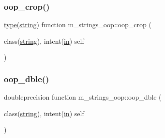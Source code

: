 \mbox{\label{namespacem__strings__oop_aa1a395d359592720a842054fd0aaff0a}} 
\subsubsection{\texorpdfstring{oop\+\_\+crop()}{oop\_crop()}}
{\footnotesize\ttfamily \hyperlink{stop__watch_83_8txt_a70f0ead91c32e25323c03265aa302c1c}{type}(\hyperlink{structm__strings__oop_1_1string}{string}) function m\+\_\+strings\+\_\+oop\+::oop\+\_\+crop (\begin{DoxyParamCaption}\item[{class(\hyperlink{structm__strings__oop_1_1string}{string}), intent(\hyperlink{M__journal_83_8txt_afce72651d1eed785a2132bee863b2f38}{in})}]{self }\end{DoxyParamCaption})\hspace{0.3cm}{\ttfamily [private]}}

\mbox{\label{namespacem__strings__oop_aa6eaf2b8a12a905d0ebaa21a84871dec}} 
\subsubsection{\texorpdfstring{oop\+\_\+dble()}{oop\_dble()}}
{\footnotesize\ttfamily doubleprecision function m\+\_\+strings\+\_\+oop\+::oop\+\_\+dble (\begin{DoxyParamCaption}\item[{class(\hyperlink{structm__strings__oop_1_1string}{string}), intent(\hyperlink{M__journal_83_8txt_afce72651d1eed785a2132bee863b2f38}{in})}]{self }\end{DoxyParamCaption})\hspace{0.3cm}{\ttfamily [private]}}

\mbox{\label{namespacem__strings__oop_a5b96d2a6f242a096cd5788cf0802e825}} 
